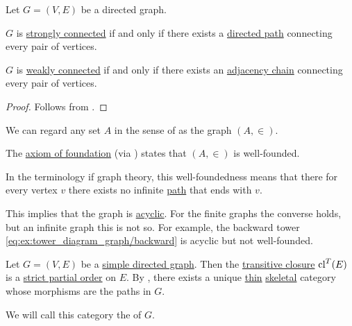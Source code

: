 \begin{proposition}\label{thm:graph_connectedness_via_chains}
  Let \( G = (V, E) \) be a directed graph.

  \begin{thmenum}
     \( G \) is \hyperref[def:graph_connectedness/strong]{strongly connected} if and only if there exists a \hyperref[def:graph_directed_path]{directed path} connecting every pair of vertices.

     \( G \) is \hyperref[def:graph_connectedness/weak]{weakly connected} if and only if there exists an \hyperref[def:graph_adjacency_chain]{adjacency chain} connecting every pair of vertices.
  \end{thmenum}
\end{proposition}
\begin{proof}
  Follows from .
\end{proof}

\begin{remark}\label{rem:well_founded_graphs}
  We can regard any set \( A \) in the sense of \hyperref[def:zfc]{} as the graph \( (A, \in) \).

  The \hyperref[def:zfc/foundation]{axiom of foundation} (via ) states that \( (A, \in) \) is well-founded.

  In the terminology if graph theory, this well-foundedness means that there for every vertex \( v \) there exists no infinite \hyperref[def:graph_directed_path]{path} that ends with \( v \).

  This implies that the graph is \hyperref[def:graph_cycle]{acyclic}. For the finite graphs the converse holds, but an infinite graph this is not so. For example, the backward tower \eqref{eq:ex:tower_diagram_graph/backward} is acyclic but not well-founded.
\end{remark}

\begin{definition}\label{def:path_category}
  Let \( G = (V, E) \) be a \hyperref[def:graph/simple]{simple directed graph}. Then the \hyperref[def:relation_closures/transitive]{transitive closure} \( \operatorname{cl}^T(E) \) is a \hyperref[def:partially_ordered_set/strict]{strict partial order} on \( E \). By , there exists a unique \hyperref[def:thin_category]{thin} \hyperref[def:skeletal_category]{skeletal} category whose morphisms are the paths in \( G \).

  We will call this category the  of \( G \).
\end{definition}

